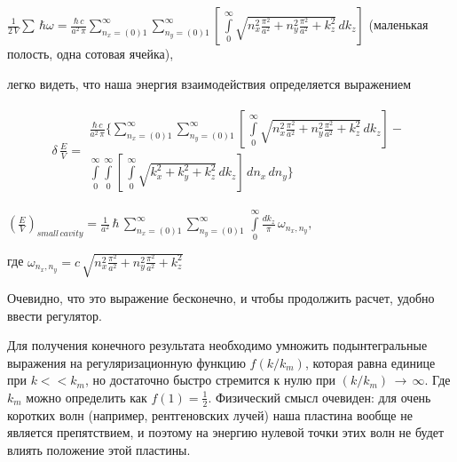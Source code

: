 \documentclass[11pt]{article}
\begin{document}
    \(\frac{1}{2\,V}\sum\,\hbar\omega = \frac{\hbar\,c}{a^2\,\pi}\sum\limits_{n_x=(0)1}^{\infty}\sum\limits_{n_y=(0)1}^{\infty}\left[\,\int\limits_{0}^{\infty}\sqrt{n_x^2\frac{\pi^2}{a^2}+n_y^2\frac{\pi^2}{a^2}+k_z^2}\,dk_z\right]\)
(маленькая полость, одна сотовая ячейка),

    легко видеть, что наша энергия взаимодействия определяется выражением


    \begin{equation} \label{eq:1}
\begin{array}{lr}
\delta\,\frac{E}{V} =
\begin{array}{c}
\frac{\hbar\,c}{a^2\,\pi}\Bigg\{\sum\limits_{n_x=(0)1}^{\infty}\sum\limits_{n_y=(0)1}^{\infty}\left[\,\int\limits_{0}^{\infty}\sqrt{n_x^2\frac{\pi^2}{a^2}+n_y^2\frac{\pi^2}{a^2}+k_z^2}\,dk_z\right] - \\ \int\limits_{0}^{\infty}\int\limits_{0}^{\infty}\left[\,\int\limits_{0}^{\infty}\sqrt{k_x^2+k_y^2+k_z^2}\,dk_z\right]\,dn_x\,dn_y\Bigg\}
\end{array}\end{array}\end{equation}

    

    \({\left(\frac{E}{V}\right)_{small\,cavity} = \frac{1}{a^2}\,\hbar \, \sum\limits_{n_x=(0)1}^{\infty}\sum\limits_{n_y=(0)1}^{\infty}\,\int\limits_{0}^{\infty} {\frac {dk_{z}}{\pi}}\,\omega _{n_x,n_y},}\)

    где
\(\omega _{n_x,n_y} = c\,\sqrt{n_x^2\frac{\pi^2}{a^2}+n_y^2\frac{\pi^2}{a^2}+k_z^2}\)

    Очевидно, что это выражение бесконечно, и чтобы продолжить расчет,
удобно ввести регулятор.

    Для получения конечного результата необходимо умножить подынтегральные
выражения на регуляризационную функцию \(f(k/k_m)\), которая равна
единице при \(k << k_m\), но достаточно быстро стремится к нулю при
\((k/k_m)\, \rightarrow\,\infty\). Где \(k_m\) можно определить как
\(f(1) = \frac{1}{2}\). Физический смысл очевиден: для очень коротких
волн (например, рентгеновских лучей) наша пластина вообще не является
препятствием, и поэтому на энергию нулевой точки этих волн не будет
влиять положение этой пластины.
\end{document}
